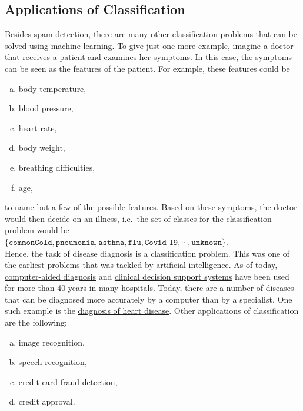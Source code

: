 \subsection{Applications of Classification}
Besides spam detection, there are many other classification problems that can be solved using machine learning.  To give
just one more example, imagine a doctor that receives a patient and examines her symptoms.  In this case,
the symptoms can be seen as the features of the patient.  For example, these features could be
\begin{enumerate}[(a)]
\item body temperature,
\item blood pressure,
\item heart rate,
\item body weight,
\item breathing difficulties,
\item age,
\end{enumerate}
to name but a few of the possible features.  Based on these symptoms, the doctor would then decide on an
illness, i.e.~the set of classes for the classification problem would be
\\[0.2cm]
\hspace*{1.3cm}
$\{ \mathtt{commonCold}, \mathtt{pneumonia}, \mathtt{asthma}, \mathtt{flu}, \texttt{Covid-19}, \cdots, \mathtt{unknown} \}$.
\\[0.2cm]
Hence, the task of disease diagnosis is a classification problem.  This was one of the earliest problems that
was tackled by artificial intelligence.  As of today, 
\href{https://en.wikipedia.org/wiki/Computer-aided_diagnosis}{computer-aided diagnosis} and 
\href{https://en.wikipedia.org/wiki/Clinical_decision_support_system}{clinical decision support systems}
have been used for more than 40 years in many hospitals.  Today, there are a number of diseases that can be
diagnosed more accurately by a computer than by a specialist.  One such example is the
\href{http://www.ultromics.com}{diagnosis of heart disease}.  Other applications of classification are the following:
\begin{enumerate}[(a)]
\item image recognition,
\item speech recognition,
\item credit card fraud detection,
\item credit approval.
\end{enumerate}

